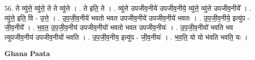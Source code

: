 \documentclass[17pt]{extarticle}
\begin{document}
56. ते व्यु॑त्ते॒ व्यु॑त्ते॒ ते ते व्यु॑त्ते । . ते इति॒ ते । . व्यु॑त्ते उपजीव॒नीये॑ उपजीव॒नीये॒ व्यु॑त्ते॒ व्यु॑त्ते उपजीव॒नीये᳚ । . व्यु॑त्ते॒ इति॒ वि - उ॒त्ते॒ । . उ॒प॒जी॒व॒नीये॑ भवतो भवत उपजीव॒नीये॑ उपजीव॒नीये॑ भवतः । . उ॒प॒जी॒व॒नीये॒ इत्यु॑प - जी॒व॒नीये᳚ । . भ॒व॒त॒ उ॒प॒जी॒व॒नीय॑ उपजीव॒नीयो॑ भवतो भवत उपजीव॒नीयः॑ । . उ॒प॒जी॒व॒नीयो॑ भवति भव त्युपजीव॒नीय॑ उपजीव॒नीयो॑ भवति । . उ॒प॒जी॒व॒नीय॒ इत्यु॑प - जी॒व॒नीयः॑ । . भ॒व॒ति॒ यो यो भ॑वति भवति॒ यः । \newline

\textbf{Ghana Paata } \newline
\end{document}

